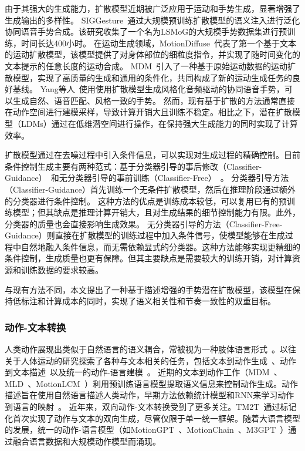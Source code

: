 由于其强大的生成能力，扩散模型\cite{cheng2024siggesture,alexanderson2023listen,tevet2022mdm,yang2023diffusestylegesture}近期被广泛应用于运动和手势生成，显著增强了生成输出的多样性。
SIGGesture~\cite{cheng2024siggesture}通过大规模预训练扩散模型的语义注入进行泛化协同语音手势合成。该研究收集了一个名为LSMoG的大规模手势数据集进行预训练，时间长达400小时。
在运动生成领域，MotionDiffuse~\cite{zhang2024motiondiffuse}代表了第一个基于文本的运动扩散模型，该模型提供了对身体部位的细粒度指令，并实现了随时间变化的文本提示的任意长度的运动合成。
MDM~\cite{tevet2022mdm}引入了一种基于原始运动数据的运动扩散模型，实现了高质量的生成和通用的条件化，共同构成了新的运动生成任务的良好基线。
Yang等人~\cite{yang2023diffusestylegesture}使用使用扩散模型生成风格化音频驱动的协同语音手势，可以生成自然、语音匹配、风格一致的手势。
然而，现有基于扩散的方法通常直接在动作空间进行建模采样，导致计算开销大且训练不稳定。相比之下，潜在扩散模型（LDMs）\cite{rombach2022high}通过在低维潜空间进行操作，在保持强大生成能力的同时实现了计算效率。

扩散模型通过在去噪过程中引入条件信息，可以实现对生成过程的精确控制。目前条件控制生成主要有两种范式：基于分类器引导的事后修改（Classifier-Guidance）~\cite{dhariwal2021diffusion}和无分类器引导的事前训练（Classifier-Free）~\cite{ho2022classifier}。
分类器引导方法（Classifier-Guidance）首先训练一个无条件扩散模型，然后在推理阶段通过额外的分类器进行条件控制。
这种方法的优点是训练成本较低，可以复用已有的预训练模型；但其缺点是推理计算开销大，且对生成结果的细节控制能力有限。此外，分类器的质量也会直接影响生成效果。
无分类器引导的方法（Classifier-Free-Guidance）则直接在扩散模型的训练过程中加入条件信号，使模型能够在生成过程中自然地融入条件信息，而无需依赖显式的分类器。这种方法能够实现更精细的条件控制，生成质量也更有保障。但其主要缺点是需要较大的训练开销，对计算资源和训练数据的要求较高。

与现有方法不同，本文提出了一种基于描述增强的手势潜在扩散模型，该模型在保持低标注和计算成本的同时，实现了语义相关性和节奏一致性的双重目标。

\subsubsection{动作-文本转换}
人类动作展现出类似于自然语言的语义耦合，常被视为一种肢体语言形式~\cite{jiang2024motiongpt}。以往关于人体运动的研究探索了各种与文本相关的任务，包括文本到动作生成~\cite{tevet2022mdm,guo2022humanml3d}、动作到文本描述~\cite{jiang2024motiongpt,guo2022tm2t}以及统一的动作-语言建模~\cite{tevet2022motionclip,jiang2024motiongpt,jiang2024motionchain}。
近期的文本到动作工作（MDM~\cite{tevet2022mdm}、MLD~\cite{chen2023executing}、MotionLCM~\cite{dai2024motionlcm}）利用预训练语言模型提取语义信息来控制动作生成。动作描述旨在使用自然语言描述人类动作，早期方法依赖统计模型和RNN来学习动作到语言的映射~\cite{takano2015statistical, yamada2018paired}。
近年来，双向动作-文本转换受到了更多关注。TM2T~\cite{guo2022tm2t}通过标记化首次实现了动作与文本的双向生成，尽管仅限于单一统一框架。随着大语言模型的发展，统一的动作-语言模型（如MotionGPT~\cite{jiang2024motiongpt}、MotionChain~\cite{jiang2024motionchain}、M3GPT~\cite{luo2024m}）通过融合语言数据和大规模动作模型而涌现。

